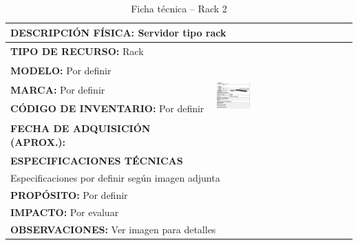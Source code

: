 \begin{table}[H]
\centering
\caption{Ficha técnica -- Rack 2}
\label{tab:rack-2}
\begin{tabular}{|p{}|p{}|}
\hline
\multicolumn{2}{|l|}{\textbf{DESCRIPCIÓN FÍSICA:} Servidor tipo rack} \\ \hline
\textbf{TIPO DE RECURSO:} Rack & 
\multirow{5}{*}{\includegraphics[width=0.25\textwidth,height=4cm,keepaspectratio]{tablas-images/cp1/racks/rack-2.png}} \\ \cline{1-1}
\textbf{MODELO:} Por definir & \\ \cline{1-1}
\textbf{MARCA:} Por definir & \\ \cline{1-1}
\textbf{CÓDIGO DE INVENTARIO:} Por definir & \\ \cline{1-1}
\textbf{FECHA DE ADQUISICIÓN (APROX.):} & \\ \hline
\multicolumn{2}{|l|}{\textbf{ESPECIFICACIONES TÉCNICAS}} \\ \hline
\multicolumn{2}{|p{0.95\textwidth}|}{
\footnotesize
Especificaciones por definir según imagen adjunta
} \\ \hline
\multicolumn{2}{|l|}{\textbf{PROPÓSITO:} Por definir} \\ \hline
\multicolumn{2}{|l|}{\textbf{IMPACTO:} Por evaluar} \\ \hline
\multicolumn{2}{|l|}{\textbf{OBSERVACIONES:} Ver imagen para detalles} \\ \hline
\end{tabular}
\end{table}

